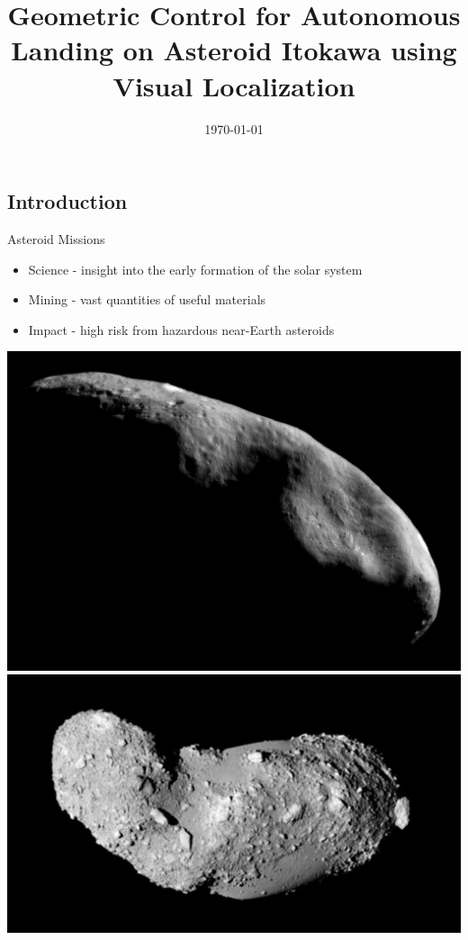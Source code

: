 \documentclass[11pt,professionalfonts]{beamer}
\title[Autonomous Landing]{\large\textbf Geometric Control for Autonomous Landing on Asteroid Itokawa using Visual Localization}
\author{\vspace*{-0.3cm}}
\institute{
	\footnotesize
	{\normalsize\bf{Shankar Kulumani, Kuya Takami \\ Taeyoung Lee}}\\
	\vspace*{0.2cm}
  	\textbf{Department of Mechanical \& Aerospace Engineering}\\ \vspace*{0.5cm}
 	\begin{figure} %
       	\texttt{[image: gw\_txh\_2cs\_pos]}
  	\end{figure}
}
\date{\today}
\begin{document}

\setcounter{framenumber}{-1}
\begin{frame} %
  \titlepage
\end{frame}   %

\section*{}
\subsection*{Introduction}  
\begin{frame}{Asteroid Missions}
\begin{itemize}
    \item Science - insight into the early formation of the solar system
    \item Mining - vast quantities of useful materials
    \item Impact - high risk from hazardous near-Earth asteroids
\end{itemize}    

\begin{center}
    \includegraphics[height=0.35\textheight]{figures/near_mos_20001203_full.jpg}
    \hfill
    \includegraphics[height=0.35\textheight]{figures/Itokawa8_hayabusa_1210.jpg}
\end{center}
\end{frame}
\end{document}
